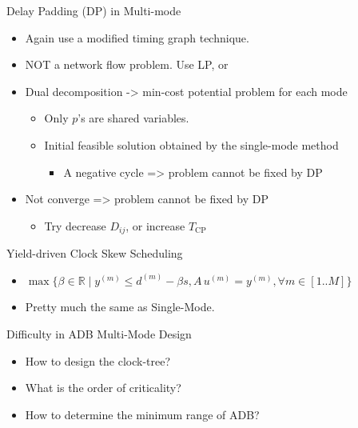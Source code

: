 \documentclass[10pt,ignorenonframetext,mathserif,onlymath]{beamer}
\providecommand{\tightlist}{%
  \setlength{\itemsep}{0pt}\setlength{\parskip}{0pt}}
\begin{document}
\begin{frame}{Delay Padding (DP) in Multi-mode}
\protect\hypertarget{delay-padding-dp-in-multi-mode}{}

\begin{itemize}
\tightlist
\item
  Again use a modified timing graph technique.
\item
  NOT a network flow problem. Use LP, or
\item
  Dual decomposition -\textgreater{} min-cost potential problem for each
  mode

  \begin{itemize}
  \tightlist
  \item
    Only \(p\)’s are shared variables.
  \item
    Initial feasible solution obtained by the single-mode method

    \begin{itemize}
    \tightlist
    \item
      A negative cycle =\textgreater{} problem cannot be fixed by DP
    \end{itemize}
  \end{itemize}
\item
  Not converge =\textgreater{} problem cannot be fixed by DP

  \begin{itemize}
  \tightlist
  \item
    Try decrease \(D_{ij}\), or increase \(T_\text{CP}\)
  \end{itemize}
\end{itemize}

\end{frame}

\begin{frame}{Yield-driven Clock Skew Scheduling}
\protect\hypertarget{yield-driven-clock-skew-scheduling-2}{}

\begin{itemize}
\tightlist
\item
  \(\max\{\beta \in \mathbb{R} \mid y^{(m)} \leq d^{(m)} - \beta s, A\,u^{(m)} = y^{(m)}, \forall m\in[1..M]\}\)
\item
  Pretty much the same as Single-Mode.
\end{itemize}

\end{frame}

\begin{frame}{Difficulty in ADB Multi-Mode Design}
\protect\hypertarget{difficulty-in-adb-multi-mode-design}{}

\begin{itemize}
\tightlist
\item
  How to design the clock-tree?
\item
  What is the order of criticality?
\item
  How to determine the minimum range of ADB?
\end{itemize}

\end{frame}
\end{document}
